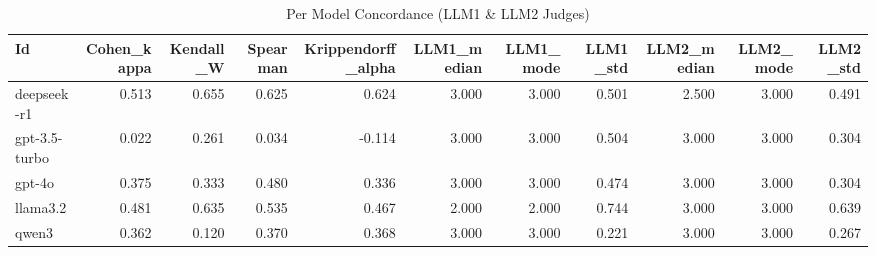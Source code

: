 \begin{table}
\caption{Per Model Concordance (LLM1 & LLM2 Judges)}
\label{tab:per_model_concordance_LLM_judges}
\begin{tabular}{lrrrrrrrrrr}
\toprule
Id & Cohen_kappa & Kendall_W & Spearman & Krippendorff_alpha & LLM1_median & LLM1_mode & LLM1_std & LLM2_median & LLM2_mode & LLM2_std \\
\midrule
deepseek-r1 & 0.513 & 0.655 & 0.625 & 0.624 & 3.000 & 3.000 & 0.501 & 2.500 & 3.000 & 0.491 \\
gpt-3.5-turbo & 0.022 & 0.261 & 0.034 & -0.114 & 3.000 & 3.000 & 0.504 & 3.000 & 3.000 & 0.304 \\
gpt-4o & 0.375 & 0.333 & 0.480 & 0.336 & 3.000 & 3.000 & 0.474 & 3.000 & 3.000 & 0.304 \\
llama3.2 & 0.481 & 0.635 & 0.535 & 0.467 & 2.000 & 2.000 & 0.744 & 3.000 & 3.000 & 0.639 \\
qwen3 & 0.362 & 0.120 & 0.370 & 0.368 & 3.000 & 3.000 & 0.221 & 3.000 & 3.000 & 0.267 \\
\bottomrule
\end{tabular}
\end{table}
